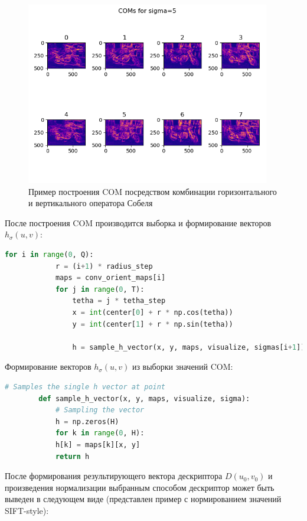 {{{{{   		\begin{figure}[H]
   			\centering                             
   			\includegraphics[width=0.95\textwidth,keepaspectratio]{daisy/gradient_orientations.png}   
   			\centering\caption{ Пример построения COM посредством комбинации горизонтального и вертикального оператора Собеля }
   			\label{gradient_orientations}                           
   		\end{figure}    
   	
   		После построения COM производится выборка и формирование векторов $h_\sigma(u,v)$:
   		
   		\begin{lstlisting}[frame=single,language=Python,mathescape=true] 
	   	for i in range(0, Q):
		   	r = (i+1) * radius_step
		   	maps = conv_orient_maps[i]
		   	for j in range(0, T):
			   	tetha = j * tetha_step
			   	x = int(center[0] + r * np.cos(tetha))
			   	y = int(center[1] + r * np.sin(tetha))
			   	
			   	h = sample_h_vector(x, y, maps, visualize, sigmas[i+1])
   		\end{lstlisting}
   		
   		Формирование векторов $h_\sigma(u,v)$ из выборки значений COM:
   		\begin{lstlisting}[frame=single,language=Python,mathescape=true]
   		# Samples the single h vector at point 
   		def sample_h_vector(x, y, maps, visualize, sigma):
	   		# Sampling the vector
	   		h = np.zeros(H)
	   		for k in range(0, H):
	   		h[k] = maps[k][x, y]
	   		return h
   		\end{lstlisting}
   		
   		После формирования результирующего вектора дескриптора $D(u_0,v_0)$ и произведения нормализации выбранным способом дескриптор может быть выведен в следующем виде (представлен пример с нормированием значений SIFT-style): 
   		
}}}}}
